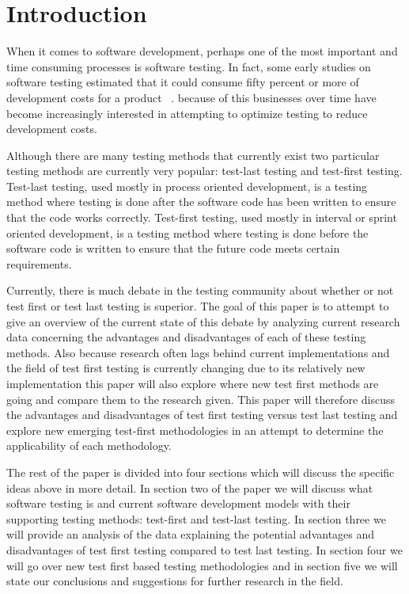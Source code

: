 \documentclass{sig-alternate}
\begin{document}


\section{Introduction}
When it comes to software development, perhaps one of the most important and time consuming processes is software testing.  In fact, some early studies on software testing estimated that it could consume fifty percent or more of development costs for a product ~\cite{Bertolino;2007}.  because of this businesses over time have become increasingly interested in attempting to optimize testing to reduce development costs.

Although there are many testing methods that currently exist two particular testing methods are currently very popular: test-last testing and test-first testing.  Test-last testing, used mostly in process oriented development, is a testing method where testing is done after the software code has been written to ensure that the code works correctly.  Test-first testing, used mostly in interval or sprint oriented development, is a testing method where testing is done before the software code is written to ensure that the future code meets certain requirements.

Currently, there is much debate in the testing community about whether or not test first or test last testing is superior.  The goal of this paper is to attempt to give an overview of the current state of this debate by analyzing current research data concerning the advantages and disadvantages of each of these testing methods.  Also because research often lags behind current implementations and the field of test first testing is currently changing due to its relatively new implementation this paper will also explore where new test first methods are going and compare them to the research given.  This paper will therefore discuss the advantages and disadvantages of test first testing versus test last testing and explore new emerging test-first methodologies in an attempt to determine the applicability of each methodology.

The rest of the paper is divided into four sections which will discuss the specific ideas above in more detail. In section two of the paper we will discuss what software testing is and current software development models with their supporting testing methods: test-first and test-last testing.  In section three we will provide an analysis of the data explaining the potential advantages and disadvantages of test first testing compared to test last testing.  In section four we will go over new test first based testing methodologies and in section five we will state our conclusions and suggestions for further research in the field.
\end{document}
